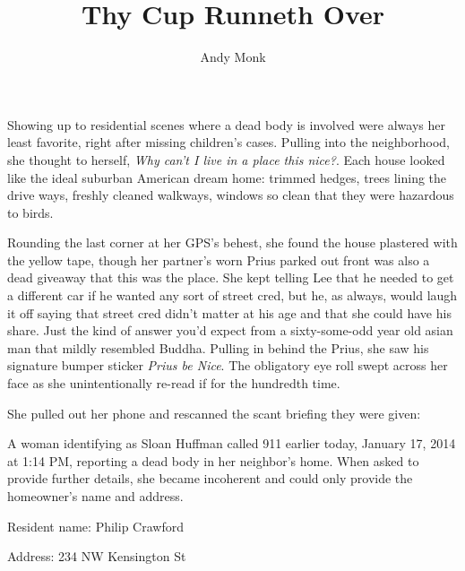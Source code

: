 \documentclass[9pt]{memoir}
\title{Thy Cup Runneth Over}
\author{Andy Monk}
\date{}
\begin{document}
\clearpage
\maketitle
\thispagestyle{empty}



\frontmatter


\mainmatter

Showing up to residential scenes where a dead body is involved were always her least favorite, right after missing children's cases. Pulling into the neighborhood, she thought to herself, \textit{Why can't I live in a place this nice?}. Each house looked like the ideal suburban American dream home: trimmed hedges, trees lining the drive ways, freshly cleaned walkways, windows so clean that they were hazardous to birds.

Rounding the last corner at her GPS's behest, she found the house plastered with the yellow tape, though her partner's worn Prius parked out front was also a dead giveaway that this was the place. She kept telling Lee that he needed to get a different car if he wanted any sort of street cred, but he, as always, would laugh it off saying that street cred didn't matter at his age and that she could have his share. Just the kind of answer you'd expect from a sixty-some-odd year old asian man that mildly resembled Buddha. Pulling in behind the Prius, she saw his signature bumper sticker \textit{Prius be Nice}. The obligatory eye roll swept across her face as she unintentionally re-read if for the hundredth time.

She pulled out her phone and rescanned the scant briefing they were given:

\vspace{1em}

\begin{displayquote}
    A woman identifying as Sloan Huffman called 911 earlier today, January 17, 2014 at 1:14 PM, reporting a dead body in her neighbor's home. When asked to provide further details, she became incoherent and could only provide the homeowner's name and address.

    Resident name: Philip Crawford

    Address: 234 NW Kensington St
\end{displayquote}
\end{document}
